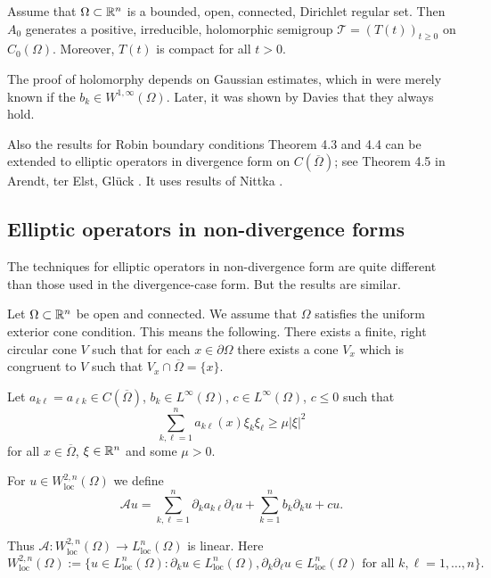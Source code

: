 \begin{theorem}
Assume that $\Omega \subset \mathbb{R}^n$ is a bounded, open, connected, Dirichlet regular set. Then $A_0$ generates a positive, irreducible, holomorphic semigroup $\mathcal{T} = (T(t))_{t \geq 0}$ on $C_0(\Omega)$. Moreover, $T(t)$ is compact for all $t > 0$.
\end{theorem}

\begin{remark*}
The proof of holomorphy depends on Gaussian estimates, which in \cite{ArBe99} were merely known if the $b_k \in W^{1,\infty}(\Omega)$. Later, it was shown by Davies \cite{Da00} that they always hold.
\end{remark*}

Also the results for Robin boundary conditions Theorem 4.3 and 4.4 can be extended to elliptic operators in divergence form on $C(\overline{\Omega})$; see Theorem 4.5 in Arendt, ter Elst, Glück \cite{AEG20}. It uses results of Nittka \cite{Ni11}.
\subsection{Elliptic operators in non-divergence forms}
The techniques for elliptic operators in non-divergence form are quite different than those used in the divergence-case form. But the results are similar.

Let $\Omega \subset \mathbb{R}^n$ be open and connected. We assume that $\Omega$ satisfies the uniform exterior cone condition. This means the following. There exists a finite, right circular cone $V$ such that for each $x \in \partial\Omega$ there exists a cone $V_x$ which is congruent to $V$ such that $V_x \cap \overline{\Omega} = \{x\}$.

Let $a_{k\ell} = a_{\ell k} \in C(\overline{\Omega})$, $b_k \in L^\infty(\Omega)$, $c \in L^\infty(\Omega)$, $c \leq 0$ such that
\[\sum_{k,\ell=1}^n a_{k\ell}(x)\xi_k\xi_\ell \geq \mu|\xi|^2\]
for all $x \in \overline{\Omega}$, $\xi \in \mathbb{R}^n$ and some $\mu > 0$.

For $u \in W^{2,n}_{\text{loc}}(\Omega)$ we define
\[\mathcal{A}u = \sum_{k,\ell=1}^n \partial_k a_{k\ell} \partial_\ell u + \sum_{k=1}^n b_k \partial_k u + cu.\]

Thus $\mathcal{A} \colon W^{2,n}_{\text{loc}}(\Omega) \to L^n_{\text{loc}}(\Omega)$ is linear. Here
\[W^{2,n}_{\text{loc}}(\Omega) := \{u \in L^n_{\text{loc}}(\Omega) \colon \partial_k u \in L^n_{\text{loc}}(\Omega), \partial_k \partial_\ell u \in L^n_{\text{loc}}(\Omega) \text{ for all } k, \ell = 1, \ldots, n\}.\]

